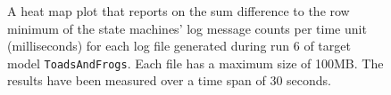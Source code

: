 \begin{figure}[htbp]
\centering
\begin{minipage}{1\textwidth}
  \centering
\end{minipage}
\caption{A heat map plot that reports on the sum difference to the row minimum of the state machines' log message counts per time unit (milliseconds) for each log file generated during run 6 of target model \texttt{ToadsAndFrogs}. Each file has a maximum size of 100MB. The results have been measured over a time span of 30 seconds.}
\label{figure:throughput_difference_toadsandfrogs_6}
\end{figure}